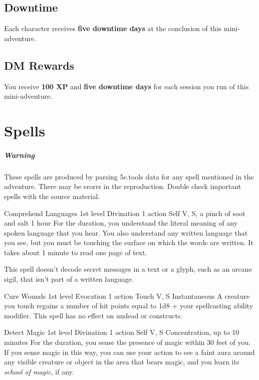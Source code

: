 \documentclass[10pt,a4paper,twoside,bg=print,twocolumn,openany,nodeprecatedcode]{dndbook}
\begin{document}
\section{Downtime}
Each character receives \textbf{five downtime days} at the conclusion of this mini-adventure.

\section{DM Rewards}
You receive \textbf{100 XP} and \textbf{five downtime days} for each session you run of this mini-adventure.

\chapter{Spells}
\paragraph{Warning} These spells are produced by parsing 5e.tools data for any spell mentioned in the adventure. There may be erorrs in the reproduction. Double check important spells with the source material.


\DndSpellHeader%
{Comprehend Languages}
{1st level Divination}
{1 action}
{Self}
{V, S, a pinch of soot and salt}
{1 hour}
For the duration, you understand the literal meaning of any spoken language that you hear. You also understand any written language that you see, but you must be touching the surface on which the words are written. It takes about 1 minute to read one page of text.

This spell doesn't decode secret messages in a text or a glyph, such as an arcane sigil, that isn't part of a written language.



\DndSpellHeader%
{Cure Wounds}
{1st level Evocation}
{1 action}
{Touch}
{V, S}
{Instantaneous}
A creature you touch regains a number of hit points equal to 1d8 + your spellcasting ability modifier. This spell has no effect on undead or constructs.



\DndSpellHeader%
{Detect Magic}
{1st level Divination}
{1 action}
{Self}
{V, S}
{Concentration, up to 10 minutes}
For the duration, you sense the presence of magic within 30 feet of you. If you sense magic in this way, you can use your action to see a faint aura around any visible creature or object in the area that bears magic, and you learn its \textit{school of magic}, if any.
\end{document}
